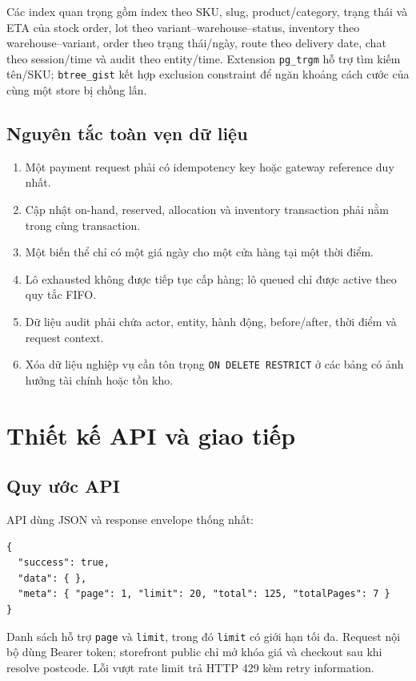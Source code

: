 \documentclass[12pt,a4paper]{report}
\begin{document}
Các index quan trọng gồm index theo SKU, slug, product/category, trạng thái và ETA của stock order, lot theo variant--warehouse--status, inventory theo warehouse--variant, order theo trạng thái/ngày, route theo delivery date, chat theo session/time và audit theo entity/time. Extension \texttt{pg\_trgm} hỗ trợ tìm kiếm tên/SKU; \texttt{btree\_gist} kết hợp exclusion constraint để ngăn khoảng cách cước của cùng một store bị chồng lấn.

\section{Nguyên tắc toàn vẹn dữ liệu}
\begin{enumerate}
  \item Một payment request phải có idempotency key hoặc gateway reference duy nhất.
  \item Cập nhật on-hand, reserved, allocation và inventory transaction phải nằm trong cùng transaction.
  \item Một biến thể chỉ có một giá ngày cho một cửa hàng tại một thời điểm.
  \item Lô exhausted không được tiếp tục cấp hàng; lô queued chỉ được active theo quy tắc FIFO.
  \item Dữ liệu audit phải chứa actor, entity, hành động, before/after, thời điểm và request context.
  \item Xóa dữ liệu nghiệp vụ cần tôn trọng \texttt{ON DELETE RESTRICT} ở các bảng có ảnh hưởng tài chính hoặc tồn kho.
\end{enumerate}

\chapter{Thiết kế API và giao tiếp}
\section{Quy ước API}
API dùng JSON và response envelope thống nhất:
\begin{lstlisting}
{
  "success": true,
  "data": { },
  "meta": { "page": 1, "limit": 20, "total": 125, "totalPages": 7 }
}
\end{lstlisting}
Danh sách hỗ trợ \texttt{page} và \texttt{limit}, trong đó \texttt{limit} có giới hạn tối đa. Request nội bộ dùng Bearer token; storefront public chỉ mở khóa giá và checkout sau khi resolve postcode. Lỗi vượt rate limit trả HTTP 429 kèm retry information.
\end{document}
